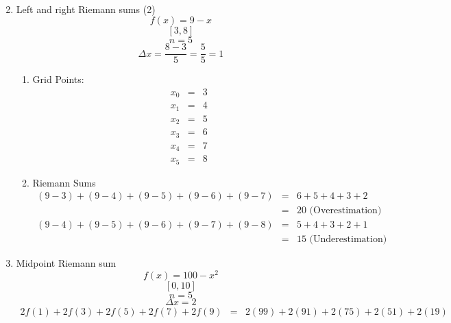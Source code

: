 \documentclass{article}
\begin{document}
\begin{enumerate}
\begin{enumerate}
\begin{eqnarray}
                \end{eqnarray}
            \end{enumerate}
        \item Left and right Riemann sums (2)
            $$f(x) = 9 - x$$
            $$[3,8]$$
            $$n = 5$$
            $$\Delta{x} = \frac{8 - 3}{5} = \frac{5}{5} = 1$$
            \begin{enumerate}
                \item Grid Points: \\
                    \begin{eqnarray}
                        x_0 &=& 3 \\
                        x_1 &=& 4 \\
                        x_2 &=& 5 \\
                        x_3 &=& 6 \\
                        x_4 &=& 7 \\
                        x_5 &=& 8
                    \end{eqnarray}
                \item Riemann Sums
                    \begin{eqnarray}
                        \left(9 - 3\right) + \left(9 - 4\right) + \left(9 - 5\right) + \left(9 - 6\right) + \left(9 - 7\right) &=& 6 + 5 + 4 + 3 + 2 \\
                                                                                                                               &=& 20 \text{ (Overestimation)}
                    \end{eqnarray}
                    \begin{eqnarray}
                        \left(9 - 4\right) + \left(9 - 5\right) + \left(9 - 6\right) + \left(9 - 7\right) + \left(9 - 8\right) &=& 5 + 4 + 3 + 2 + 1 \\
                                                                                                                               &=& 15 \text{ (Underestimation)}
                    \end{eqnarray}
            \end{enumerate}
        \item Midpoint Riemann sum
            $$f(x) = 100 - x^2$$
            $$[0, 10]$$
            $$n = 5$$
            $$\Delta{x} = 2$$
            \begin{eqnarray}
                2f(1) + 2f(3) + 2f(5) + 2f(7) + 2f(9) &=& 2(99) + 2(91) + 2(75) + 2(51) + 2(19) \\

\end{eqnarray}
\end{enumerate}
\end{document}
